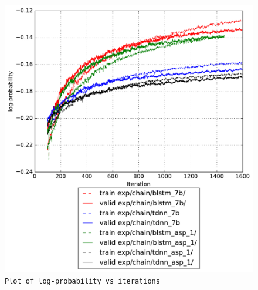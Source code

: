 \documentclass[prl,10pt,twocolumn]{revtex4}
\begin{document}
\newpage
\begin{figure}[h]
  \begin{center}
    \caption{\texttt{Plot of log-probability vs iterations}}
    \includegraphics[width=\textwidth]{exp/chain/blstm_7b/report/log_probability.pdf}
  \end{center}
\end{figure}
\clearpage
\end{document}
